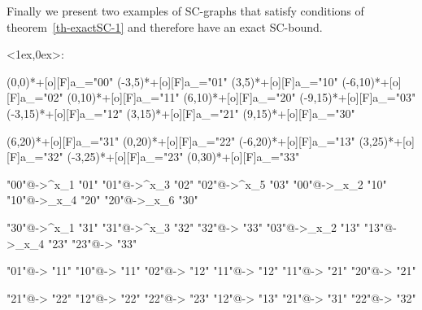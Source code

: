 \documentclass{article}
\newenvironment{network}%
    {\begin{xy}<1ex,0ex>:}%
    {\end{xy}}
\def\nnNode[#1](#2)#3{\POS(#2)*#3="#1"}
\def\nnLink[#1,#2]#3{\POS"#1"\ar #3 "#2"}
\begin{document}
Finally we present two examples of SC-graphs that satisfy conditions of theorem~\ref{th-exactSC-1} and therefore have an exact SC-bound.

       \begin{center} \begin{network}

            \nnNode[00](0,0)      {+[o][F]{a_{}}}
            \nnNode[01](-3,5)     {+[o][F]{a_{}}}
            \nnNode[10](3,5)      {+[o][F]{a_{}}}
            \nnNode[02](-6,10)    {+[o][F]{a_{}}}
            \nnNode[11](0,10)     {+[o][F]{a_{}}}
            \nnNode[20](6,10)     {+[o][F]{a_{}}}
            \nnNode[03](-9,15)   {+[o][F]{a_{}}}
            \nnNode[12](-3,15)    {+[o][F]{a_{}}}
            \nnNode[21](3,15)     {+[o][F]{a_{}}}
            \nnNode[30](9,15)    {+[o][F]{a_{}}}

				\nnNode[31](6,20)      {+[o][F]{a_{}}}
            \nnNode[22](0,20)     {+[o][F]{a_{}}}
            \nnNode[13](-6,20)      {+[o][F]{a_{}}}
            \nnNode[32](3,25)    {+[o][F]{a_{}}}
            \nnNode[23](-3,25)     {+[o][F]{a_{}}}
            \nnNode[33](0,30)     {+[o][F]{a_{}}}

            \nnLink[00,01] {@{->}^{x_1}}
            \nnLink[01,02] {@{->}^{x_3}}
            \nnLink[02,03] {@{->}^{x_5}}
            \nnLink[00,10] {@{->}_{x_2}}
            \nnLink[10,20] {@{->}_{x_4}}
            \nnLink[20,30] {@{->}_{x_6}}

				\nnLink[30,31] {@{->}^{x_1}}
            \nnLink[31,32] {@{->}^{x_3}}
            \nnLink[32,33] {@{->}}
            \nnLink[03,13] {@{->}_{x_2}}
            \nnLink[13,23] {@{->}_{x_4}}
            \nnLink[23,33] {@{->}}


            \nnLink[01,11] {@{->}}
            \nnLink[10,11] {@{->}}
            \nnLink[02,12] {@{->}}
            \nnLink[11,12] {@{->}}
            \nnLink[11,21] {@{->}}
            \nnLink[20,21] {@{->}}

				\nnLink[21,22] {@{->}}
            \nnLink[12,22] {@{->}}
            \nnLink[22,23] {@{->}}
            \nnLink[12,13] {@{->}}
            \nnLink[21,31] {@{->}}
            \nnLink[22,32] {@{->}}


\end{network}
\end{center}
\end{document}

